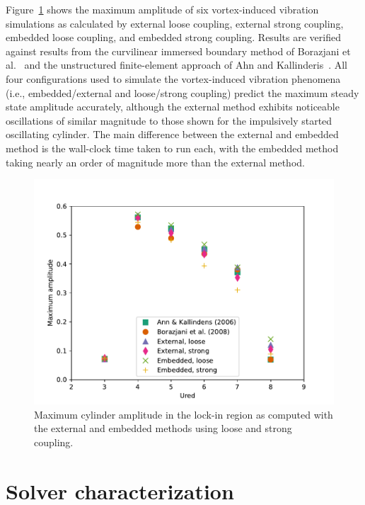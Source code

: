 \documentclass[preprint,12pt]{elsarticle}
\begin{document}
Figure~\ref{fig:viv_combine} shows the maximum amplitude of six vortex-induced
vibration simulations as calculated by external loose coupling, external strong coupling,
embedded loose coupling, and embedded strong coupling.
Results are verified against results from the curvilinear immersed boundary method of Borazjani
et al.~\cite{borazjani2008curvilinear} and the unstructured finite-element approach
of Ahn and Kallinderis~\cite{ahn2006strongly}.
All four configurations used to simulate the vortex-induced vibration phenomena
(i.e., embedded/external and loose/strong coupling) predict the maximum steady state
amplitude accurately, although the external method exhibits noticeable oscillations
of similar magnitude to those shown for the impulsively started oscillating cylinder.
The main difference between the external and embedded method is the wall-clock time
taken to run each, with the embedded method taking nearly an order of magnitude more
than the external method.
\begin{figure}
    \centering
    \includegraphics[width=\textwidth]{VIV_combine}
    \caption{Maximum cylinder amplitude in the lock-in region as computed with the
    external and embedded methods using loose and strong coupling.}
    \label{fig:viv_combine}
\end{figure}

\section{Solver characterization}
\label{chapter:error}
\end{document}
